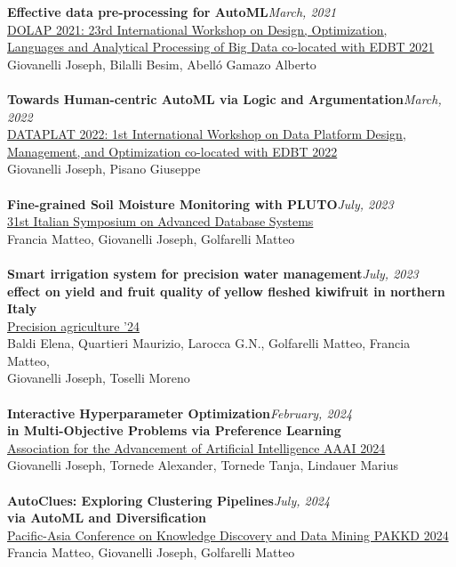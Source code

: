 \textbf{Effective data pre-processing for AutoML}\hfill \textit{March, 2021}\\
\underline{DOLAP 2021: 23rd International Workshop on Design, Optimization,}\\
\underline{Languages and Analytical Processing of Big Data co-located with EDBT 2021}\\
Giovanelli Joseph, Bilalli Besim, Abelló Gamazo Alberto\\
\\
\textbf{Towards Human-centric AutoML via Logic and Argumentation}\hfill \textit{March, 2022}\\
\underline{DATAPLAT 2022: 1st International Workshop on Data Platform Design,}\\
\underline{Management, and Optimization co-located with EDBT 2022}\\
Giovanelli Joseph, Pisano Giuseppe\\
\\
\textbf{Fine-grained Soil Moisture Monitoring with PLUTO}\hfill \textit{July, 2023}\\
\underline{31st Italian Symposium on Advanced Database Systems}\\
Francia Matteo, Giovanelli Joseph, Golfarelli Matteo\\
\\
\textbf{Smart irrigation system for precision water management}\hfill \textit{July, 2023}\\
\textbf{effect on yield and fruit quality of yellow fleshed kiwifruit in northern Italy}\\
\underline{Precision agriculture '24}\\
Baldi Elena, Quartieri Maurizio, Larocca G.N., Golfarelli Matteo, Francia Matteo,\\
Giovanelli Joseph, Toselli Moreno\\
\\
\textbf{Interactive Hyperparameter Optimization}\hfill \textit{February, 2024}\\
\textbf{in Multi-Objective Problems via Preference Learning}\\
\underline{Association for the Advancement of Artificial Intelligence AAAI 2024}\\
Giovanelli Joseph, Tornede Alexander, Tornede Tanja, Lindauer Marius\\
\\
\textbf{AutoClues: Exploring Clustering Pipelines}\hfill \textit{July, 2024}\\
\textbf{via AutoML and Diversification}\\
\underline{Pacific-Asia Conference on Knowledge Discovery and Data Mining PAKKD 2024}\\
Francia Matteo, Giovanelli Joseph, Golfarelli Matteo\\